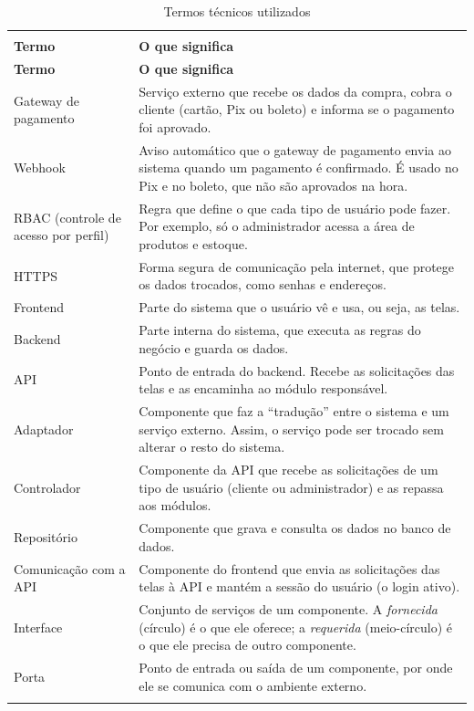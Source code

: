 \documentclass[12pt,a4paper]{article}
\begin{document}
{\setlength{\arrayrulewidth}{0.3pt}\renewcommand{\arraystretch}{1.0}\small{}
\begin{xltabular}{\textwidth}{>{\raggedright\arraybackslash}p{3.6cm}|>{\raggedright\arraybackslash}X}
\caption{Termos técnicos utilizados}\\
\toprule{}
\textbf{Termo} & \textbf{O que significa}\\ \midrule{}
\endfirsthead
{}\toprule{}
\textbf{Termo} & \textbf{O que significa}\\ \midrule{}
\endhead
\endlastfoot
Gateway de pagamento & Serviço externo que recebe os dados da compra, cobra o cliente (cartão, Pix ou boleto) e informa se o pagamento foi aprovado.\\ \hline
Webhook & Aviso automático que o gateway de pagamento envia ao sistema quando um pagamento é confirmado. É usado no Pix e no boleto, que não são aprovados na hora.\\ \hline
RBAC (controle de acesso por perfil) & Regra que define o que cada tipo de usuário pode fazer. Por exemplo, só o administrador acessa a área de produtos e estoque.\\ \hline
HTTPS & Forma segura de comunicação pela internet, que protege os dados trocados, como senhas e endereços.\\ \hline
Frontend & Parte do sistema que o usuário vê e usa, ou seja, as telas.\\ \hline
Backend & Parte interna do sistema, que executa as regras do negócio e guarda os dados.\\ \hline
API & Ponto de entrada do backend. Recebe as solicitações das telas e as encaminha ao módulo responsável.\\ \hline
Adaptador & Componente que faz a ``tradução'' entre o sistema e um serviço externo. Assim, o serviço pode ser trocado sem alterar o resto do sistema.\\ \hline
Controlador & Componente da API que recebe as solicitações de um tipo de usuário (cliente ou administrador) e as repassa aos módulos.\\ \hline
Repositório & Componente que grava e consulta os dados no banco de dados.\\ \hline
Comunicação com a API & Componente do frontend que envia as solicitações das telas à API e mantém a sessão do usuário (o login ativo).\\ \hline
Interface & Conjunto de serviços de um componente. A \emph{fornecida} (círculo) é o que ele oferece; a \emph{requerida} (meio-círculo) é o que ele precisa de outro componente.\\ \hline
Porta & Ponto de entrada ou saída de um componente, por onde ele se comunica com o ambiente externo.\\ \bottomrule
\end{xltabular}}
\end{document}

